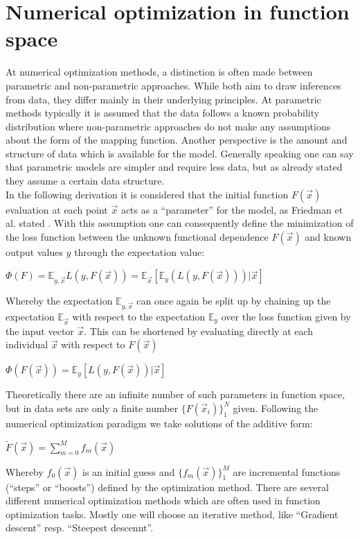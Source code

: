 \documentclass[12pt, a4paper]{article}
\begin{document}
\section{Numerical optimization in function space}
\label{sec: parameter_opt}
At numerical optimization methods, a distinction is often made between parametric and non-parametric approaches. While both aim to draw inferences from data, they differ mainly in their underlying principles.
At parametric methods typically it is assumed that the data follows a known probability distribution where  non-parametric approaches do not make any assumptions about the form of the mapping function. Another perspective is the amount and structure of data which is available for the model. Generally speaking one can say that parametric models are simpler and require less data, but as already stated they assume a certain data structure.\\
In the following derivation it is considered that the initial function $F(\vec{x})$ evaluation at each point $\vec{x}$ acts as a ``parameter'' for the model, as Friedman et al. stated \cite{Friedman2001}. With this assumption one can consequently define the minimization of the loss function between the unknown functional dependence $F(\vec{x})$ and known output values $y$ through the expectation value:
\begin{center}
    $\Phi(F) = \mathbb{E}_{y,\vec{x}} L(y,F(\vec{x})) = \mathbb{E}_{\vec{x}}[\mathbb{E}_y(L(y,F(\vec{x})))|\vec{x}]$
\end{center}
Whereby the expectation $\mathbb{E}_{y,\vec{x}}$ can once again be split up by chaining up the expectation $\mathbb{E}_{\vec{x}}$ with respect to the expectation $\mathbb{E}_y$ over the loss function given by the input vector $\vec{x}$. This can be shortened by evaluating directly at each individual $\vec{x}$ with respect to $F(\vec{x})$
\begin{center}
    $\Phi(F(\vec{x})) = \mathbb{E}_y [L(y,F(\vec{x}))|\vec{x}]$
\end{center}
Theoretically there are an infinite number of such parameters in function space, but in data sets are only a finite number $\{F(\vec{x}_i)\}_1^N$ given. Following the numerical optimization paradigm we take solutions of the additive form:
\begin{center}
    $\tilde{F}(\vec{x}) = \sum_{m=0}^{M} f_m(\vec{x})$
\end{center}
Whereby $f_0(\vec{x})$ is an initial guess and $\{f_m(\vec{x})\}_1^M$ are incremental functions (``steps'' or ``boosts'') defined by the optimization method. There are several different numerical optimization methods which are often used in function optimization tasks. Mostly one will choose an iterative method, like ``Gradient descent'' resp. ``Steepest descennt''. \\
\end{document}
